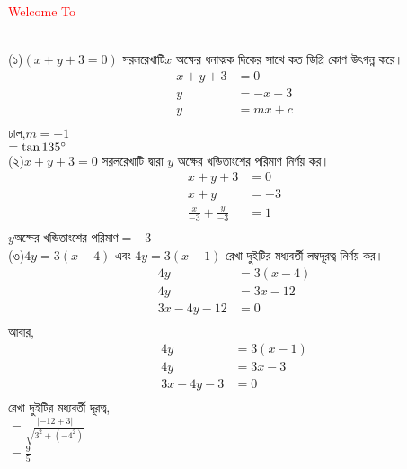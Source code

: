 \documentclass{article}
\begin{document}
 
	\Large
	\textcolor{red}{Welcome To} 
	\\
\\
(১)$(x+y+3=0)$ সরলরেখাটি$x$ অক্ষের ধনাত্মক দিকের সাথে কত ডিগ্রি কোণ উৎপন্ন করে।\\
\begin{align*}
	x+y+3&=0\\
	y&=-x-3\\
	y&=mx+c\\
\end{align*} 
ঢাল,$m=-1$\\
$=\tan135\degree$\\

(২)$x+y+3=0$ সরলরেখাটি দ্বারা  $y$ অক্ষের খন্ডিতাংশের পরিমাণ নির্ণয় কর।\\
\begin{align*}
	x+y+3&=0\\
	x+y&=-3\\
	\frac{x}{-3}+\frac{y}{-3}&=1\\
\end{align*}
$y$অক্ষের খন্ডিতাংশের পরিমাণ$=-3$\\

(৩)$4y=3(x-4)$ এবং $4y=3(x-1)$ রেখা দুইটির মধ্যবর্তী লম্বদূরত্ব নির্ণয় কর।\\
\begin{align*}
	4y&=3(x-4)\\
	4y&=3x-12\\
	3x-4y-12&=0\\
\end{align*}
আবার,\\
\begin{align*}
	4y&=3(x-1)\\
	4y&=3x-3\\
	3x-4y-3&=0\\
\end{align*}
রেখা দুইটির মধ্যবর্তী দূরত্ব,\\
$=\frac{|-12+3|}{\sqrt{3^2+(-4^2)}}$\\
$=\frac{9}{5}$\\ 
\end{document}
